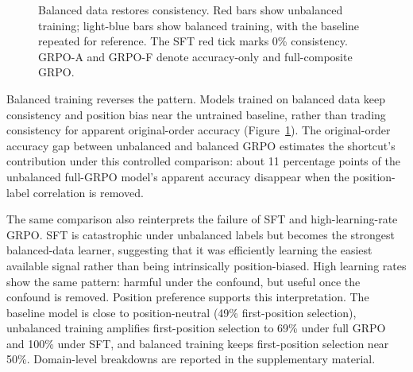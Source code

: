 \documentclass[letterpaper]{article}
\begin{document}
\begin{figure}[t]
\centering
{}
\caption{Balanced data restores consistency. Red bars show unbalanced training; light-blue bars show balanced training, with the baseline repeated for reference. The SFT red tick marks 0\% consistency. GRPO-A and GRPO-F denote accuracy-only and full-composite GRPO.}
\label{fig:fix}
\end{figure}

Balanced training reverses the pattern. Models trained on balanced data keep consistency and position bias near the untrained baseline, rather than trading consistency for apparent original-order accuracy (Figure~\ref{fig:fix}). The original-order accuracy gap between unbalanced and balanced GRPO estimates the shortcut's contribution under this controlled comparison: about 11 percentage points of the unbalanced full-GRPO model's apparent accuracy disappear when the position-label correlation is removed.

The same comparison also reinterprets the failure of SFT and high-learning-rate GRPO. SFT is catastrophic under unbalanced labels but becomes the strongest balanced-data learner, suggesting that it was efficiently learning the easiest available signal rather than being intrinsically position-biased. High learning rates show the same pattern: harmful under the confound, but useful once the confound is removed. Position preference supports this interpretation. The baseline model is close to position-neutral (49\% first-position selection), unbalanced training amplifies first-position selection to 69\% under full GRPO and 100\% under SFT, and balanced training keeps first-position selection near 50\%. Domain-level breakdowns are reported in the supplementary material.
\end{document}
